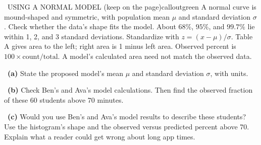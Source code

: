 \documentclass[11pt]{article}
\begin{document}
\begin{callout}{\IconBook\ USING A NORMAL MODEL (keep on the page)}{calloutgreen}
A normal curve is mound-shaped and symmetric, with population mean $\mu$ and standard deviation $\sigma$. Check whether the data's shape fits the model. About $68\%$, $95\%$, and $99.7\%$ lie within 1, 2, and 3 standard deviations. Standardize with $z=(x-\mu)/\sigma$. Table A gives area to the left; right area is 1 minus left area. Observed percent is $100\times\text{count}/\text{total}$. A model's calculated area need not match the observed data.
\end{callout}

~\textbf{(a)} State the proposed model's mean $\mu$ and standard deviation $\sigma$, with units.\par
{}

~\textbf{(b)} Check Ben's and Ava's model calculations. Then find the observed fraction of these 60 students above 70 minutes.\par
{}

~\textbf{(c)} Would you use Ben's and Ava's model results to describe these students? Use the histogram's shape and the observed versus predicted percent above 70. Explain what a reader could get wrong about long app times.\par
{}
\end{document}
